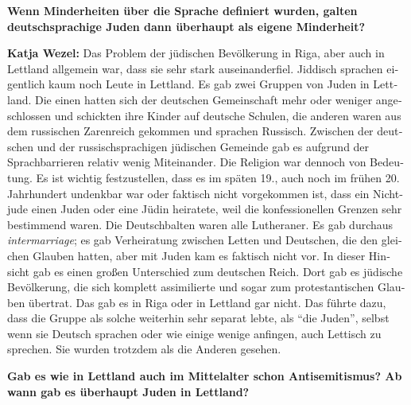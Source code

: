 \begin{otherlanguage}{ngerman}
\textbf{Wenn Minderheiten über die Sprache definiert wurden, galten deutschsprachige Juden dann überhaupt als eigene Minderheit?} 

\textbf{Katja Wezel:} Das Problem der jüdischen Bevölkerung in Riga, aber auch in Lettland allgemein war, dass sie sehr stark auseinanderfiel. Jiddisch sprachen eigentlich kaum noch Leute in Lettland. Es gab zwei Gruppen von Juden in Lettland. Die einen hatten sich der deutschen Gemeinschaft mehr oder weniger angeschlossen und schickten ihre Kinder auf deutsche Schulen, die anderen waren aus dem russischen Zarenreich gekommen und sprachen Russisch. Zwischen der deutschen und der russischsprachigen jüdischen Gemeinde gab es aufgrund der Sprachbarrieren relativ wenig Miteinander. 
Die Religion war dennoch von Bedeutung. Es ist wichtig festzustellen, dass es im späten 19., auch noch im frühen 20. Jahrhundert undenkbar war oder faktisch nicht vorgekommen ist, dass ein Nichtjude einen Juden oder eine Jüdin heiratete, weil die konfessionellen Grenzen sehr bestimmend waren. Die Deutschbalten waren alle Lutheraner. Es gab durchaus \textit{intermarriage}; es gab Verheiratung zwischen Letten und Deutschen, die den gleichen Glauben hatten, aber mit Juden kam es faktisch nicht vor. In dieser Hinsicht gab es einen großen Unterschied zum deutschen Reich. Dort gab es jüdische Bevölkerung, die sich komplett assimilierte und sogar zum protestantischen Glauben übertrat. Das gab es in Riga oder in Lettland gar nicht. Das führte dazu, dass die Gruppe als solche weiterhin sehr separat lebte, als ``die Juden'', selbst wenn sie Deutsch sprachen oder wie einige wenige anfingen, auch Lettisch zu sprechen. Sie wurden trotzdem als die Anderen gesehen. 

\textbf{Gab es wie in Lettland auch im Mittelalter schon Antisemitismus? Ab wann gab es überhaupt Juden in Lettland?}


\end{otherlanguage}
